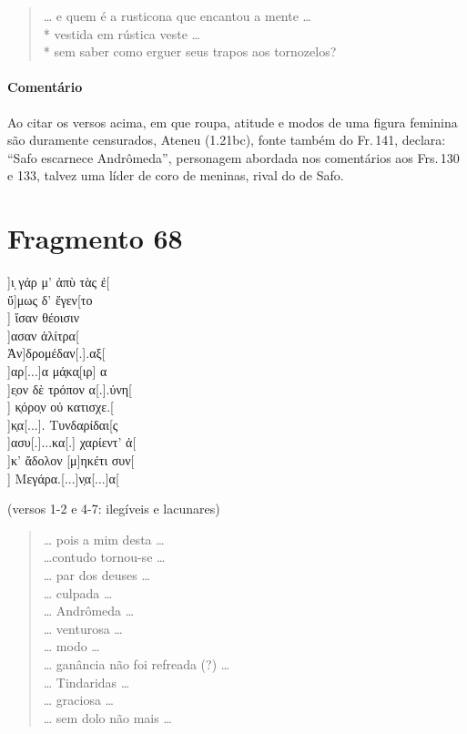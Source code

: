 \begin{verse}
\ldots{} e quem é a rusticona que encantou a mente \ldots{}\\*
vestida em rústica veste \ldots{}\\*
sem saber como erguer seus trapos aos tornozelos?
\end{verse}

{\paragraph{Comentário} Ao citar os versos acima, em que roupa, atitude e modos de uma figura feminina são
duramente censurados, Ateneu (1.21bc), fonte também do Fr.\,141, declara: ``Safo
escarnece Andrômeda”, personagem abordada nos comentários aos Frs.\,130 e 133, talvez uma líder de coro de meninas, rival do de Safo.}


\pagebreak
\section{Fragmento 68} 

\begin{gkverse}
]ι ̣γάρ μ’ ἀπὺ τὰς ἐ[\\
ὔ]μως δ’ ἔγεν[το\\
   ] ἴσαν θέοισιν\\
 ]ασαν ἀλίτρα[\\
        Ἀν]δρομέδαν[.].αξ[\\
   ]αρ[...]α μά̣κα̣[ιρ] α\\
 ]ε̣ον δὲ τρόπον α[.].ύνη[\\
      ] κ̣όρο̣ν οὐ κατισχε.[\\
]κ̣α[...]. Τυνδαρίδαι[ς\\
]ασυ[.]...κα[.] χαρίεντ’ ἀ[\\
]κ’ ἄδολον [μ]ηκέτι συν[\\
] Μεγάρα.[...]ν̣α[...]α[

\textnormal{(versos 1-2 e 4-7: ilegíveis e lacunares)}
\end{gkverse}

\begin{verse}
\ldots{} pois a mim desta \ldots{}\\
\ldots{}contudo tornou-se \ldots{}\\
\ldots{} par dos deuses \ldots{}\\
\ldots{} culpada \ldots{}\\
\ldots{} Andrômeda \ldots{}\\
\ldots{} venturosa \ldots{}\\
\ldots{} modo \ldots{}\\
\ldots{} ganância não foi refreada (?) \ldots{}\\
\ldots{} Tindaridas \ldots{}\\
\ldots{} graciosa \ldots{}\\
\ldots{} sem dolo não mais \ldots{}
\end{verse}

